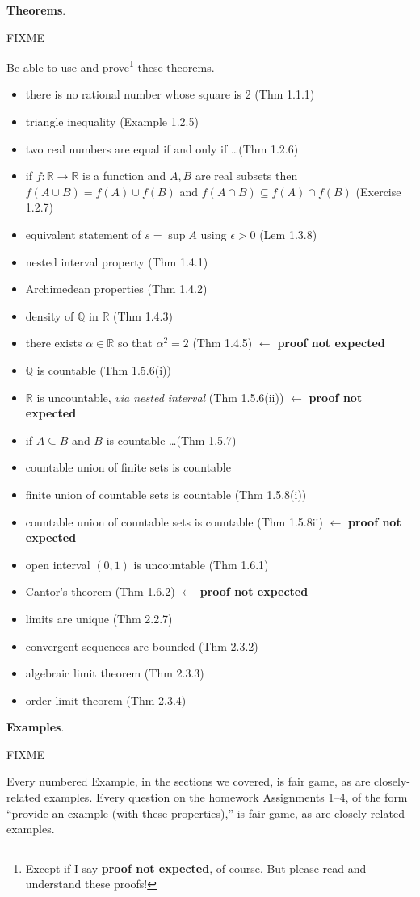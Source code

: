 \documentclass[12pt]{amsart}
\newcommand{\QQ}{{\mathbb{Q}}}
\newcommand{\RR}{{\mathbb{R}}}
\newcommand{\eps}{\epsilon}
\begin{document}
\newcommand{\pne}{\hfill {\footnotesize $\leftarrow$ \textbf{proof not expected}}}
\noindent \textbf{Theorems}.  

FIXME

Be able to use and prove\footnote{Except if I say \textbf{proof not expected}, of course.  But please read and understand these proofs!} these theorems.
\begin{itemize}
\item there is no rational number whose square is 2 (Thm 1.1.1)
\item triangle inequality (Example 1.2.5)
\item two real numbers are equal if and only if \dots (Thm 1.2.6)
\item if $f:\RR\to\RR$ is a function and $A,B$ are real subsets then $f(A\cup B) = f(A) \cup f(B)$ and $f(A\cap B) \subseteq f(A) \cap f(B)$ (Exercise 1.2.7)
\item equivalent statement of $s=\sup A$ using $\eps>0$ (Lem 1.3.8)
\item nested interval property (Thm 1.4.1)
\item Archimedean properties (Thm 1.4.2)
\item density of $\QQ$ in $\RR$ (Thm 1.4.3)
\item there exists $\alpha\in\RR$ so that $\alpha^2=2$ (Thm 1.4.5) \pne
\item $\QQ$ is countable (Thm 1.5.6(i))
\item $\RR$ is uncountable, \emph{via nested interval} (Thm 1.5.6(ii)) \pne
\item if $A\subseteq B$ and $B$ is countable \dots (Thm 1.5.7)
\item countable union of finite sets is countable
\item finite union of countable sets is countable (Thm 1.5.8(i))
\item countable union of countable sets is countable (Thm 1.5.8ii) \pne
\item open interval $(0,1)$ is uncountable (Thm 1.6.1)
\item Cantor's theorem (Thm 1.6.2) \pne
\item limits are unique (Thm 2.2.7)
\item convergent sequences are bounded (Thm 2.3.2)
\item algebraic limit theorem (Thm 2.3.3)
\item order limit theorem (Thm 2.3.4)
\end{itemize}


\bigskip
\noindent \textbf{Examples}.  

FIXME

Every numbered Example, in the sections we covered, is fair game, as are closely-related examples.  Every question on the homework Assignments 1--4, of the form ``provide an example (with these properties),'' is fair game, as are closely-related examples.

\vfill
\end{document}
